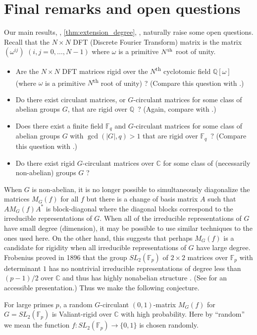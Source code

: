 \documentclass{toc}
\newcommand\F{{\mathbb{F}}}
\renewcommand\Q{{\mathbb{Q}}}
\renewcommand\C{{\mathbb{C}}}
\newcommand{\ts}{\textsuperscript}
\begin{document}
%
\section{Final remarks and open questions}
\label{sec_conclusion} 
Our main results,
%
%
, \ref{thm:extension_degree},
,
naturally raise
%
some     %
open questions.
%
Recall that the $N\times N$ DFT (Discrete Fourier Transform)
matrix is the matrix $(\omega^{ij})$ $(i,j=0,\dots, N-1)$
where $\omega$ is a primitive $N\ts{th}$ root of unity.
\begin{itemize}
\item Are the $N \times N$ DFT matrices rigid over
  the $N$\ts{th} cyclotomic field $\Q[\omega]$
  (where $\omega$ is a primitive $N$\ts{th} root of unity) ?
  (Compare this question with .)
%
%
%
%
\item Do there exist circulant matrices, or $G$-circulant matrices for
   some class of abelian groups $G$, that are rigid over $\Q$\, ? 
  (Again, compare with .)
\item Does there exist a finite field $\F_q$ and $G$-circulant matrices for
   some class of abelian groups $G$ with $\gcd(|G|, q ) > 1$ that are rigid over $\F_q$\, ? 
  (Compare this question with .)
\item Do there exist rigid $G$-circulant matrices over $\C$ 
  for some class of (necessarily non-abelian) groups $G$ ?
\end{itemize}

When $G$ is non-abelian, it is no longer possible to simultaneously 
diagonalize the matrices $M_G(f)$ for all $f$  
but there is a change of basis matrix $A$ such that $AM_G(f)A^*$
is block-diagonal where the diagonal blocks correspond to the irreducible
representations of $G$.  When all of the irreducible representations of $G$
have small degree (dimension),  
it may be possible to use similar techniques to the ones used here.
On the other hand, this suggests that perhaps $M_G(f)$ is a candidate
for rigidity when all irreducible representations of $G$
have large degree.  Frobenius proved in 1896 
that the group $SL_2(\F_p)$ of $2 \times 2$ matrices over $\F_p$ with
determinant $1$ has no nontrivial irreducible representations
of degree less than $(p-1)/2$ over $\C$ 
and thus has highly nonabelian structure \cite{frobenius1896}.
%
(See \cite{davidoff} for an accessible presentation.)  %
Thus we make the following conjecture. %
%
%
%
%
%
%
%
%
%
\begin{conjecture}
For large primes $p$, a random $G$-circulant $(0,1)$-matrix
$M_G(f)$ for $G = SL_2(\F_p)$ is Valiant-rigid over $\C$ with
high probability.  Here by ``random'' we mean the function
$f:SL_2(\F_p) \rightarrow \{0,1\}$ is chosen randomly.
\end{conjecture}
\end{document}

